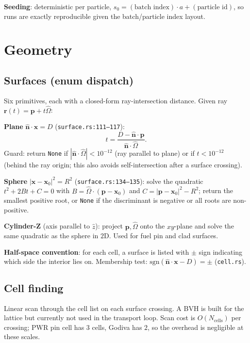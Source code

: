 \documentclass[11pt,a4paper]{article}
\begin{document}
\textbf{Seeding}: deterministic per particle,
$s_0 = (\text{batch index}) \cdot a + (\text{particle id})$, so runs
are exactly reproducible given the batch/particle index layout.

\section{Geometry}

\subsection{Surfaces (enum dispatch)}

Six primitives, each with a closed-form ray-intersection
distance. Given ray $\mathbf{r}(t) = \mathbf{p} + t\hat{\Omega}$:

\textbf{Plane} $\hat{\mathbf{n}} \cdot \mathbf{x} = D$
(\texttt{surface.rs:111--117}):
\begin{equation}
t = \frac{D - \hat{\mathbf{n}}\cdot\mathbf{p}}
{\hat{\mathbf{n}}\cdot\hat{\Omega}}.
\end{equation}
Guard: return \texttt{None} if $|\hat{\mathbf{n}}\cdot\hat{\Omega}| <
10^{-12}$ (ray parallel to plane) or if $t < 10^{-12}$
(behind the ray origin; this also avoids self-intersection after
a surface crossing).

\textbf{Sphere} $|\mathbf{x} - \mathbf{x}_0|^2 = R^2$
(\texttt{surface.rs:134--135}): solve the quadratic
$t^2 + 2 B t + C = 0$ with $B = \hat{\Omega} \cdot
(\mathbf{p} - \mathbf{x}_0)$ and
$C = |\mathbf{p} - \mathbf{x}_0|^2 - R^2$; return the smallest
positive root, or \texttt{None} if the discriminant is negative
or all roots are non-positive.

\textbf{Cylinder-Z} (axis parallel to $\hat{z}$):
project $\mathbf{p}, \hat{\Omega}$ onto the $xy$-plane and solve
the same quadratic as the sphere in $2$D. Used for fuel pin
and clad surfaces.

\textbf{Half-space convention}: for each cell, a surface is
listed with $\pm$ sign indicating which side the interior lies
on. Membership test:
$\mathrm{sgn}(\hat{\mathbf{n}} \cdot \mathbf{x} - D) = \pm$
(\texttt{cell.rs}).

\subsection{Cell finding}

Linear scan through the cell list on each surface crossing.
A BVH is built for the lattice but currently not used in
the transport loop. Scan cost is $O(N_\text{cells})$ per
crossing; PWR pin cell has $3$ cells, Godiva has $2$, so the
overhead is negligible at these scales.
\end{document}
